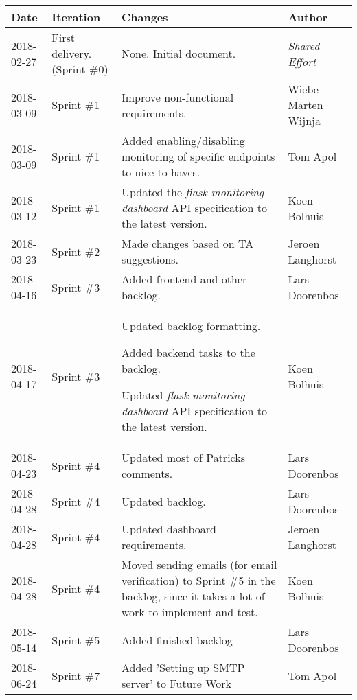 \documentclass[12pt]{article}
\begin{document}
\begin{longtable}[width=\pagewidth]{@{}llp{6cm}l@{}}
\textbf{Date} & \textbf{Iteration} & \textbf{Changes} &
\textbf{Author}\tabularnewline
\endhead
2018-02-27 & First delivery. (Sprint \#0) & None. Initial document. &
\emph{Shared Effort}\tabularnewline
2018-03-09 & Sprint \#1 & Improve non-functional requirements. &
Wiebe-Marten Wijnja\tabularnewline
2018-03-09 & Sprint \#1 & Added enabling/disabling monitoring of
specific endpoints to nice to haves. & Tom Apol\tabularnewline
2018-03-12 & Sprint \#1 & Updated the \emph{flask-monitoring-dashboard}
API specification to the latest version. & Koen Bolhuis\tabularnewline
2018-03-23 & Sprint \#2 & Made changes based on TA suggestions. & Jeroen
Langhorst\tabularnewline
2018-04-16 & Sprint \#3 & Added frontend and other backlog. & Lars
Doorenbos\tabularnewline
\begin{minipage}[t]{0.22\columnwidth}\raggedright
2018-04-17\strut
\end{minipage} & \begin{minipage}[t]{0.22\columnwidth}\raggedright
Sprint \#3\strut
\end{minipage} & \begin{minipage}[t]{0.22\columnwidth}\raggedright
Updated backlog formatting.

Added backend tasks to the backlog.

Updated \emph{flask-monitoring-dashboard} API specification to the
latest version.\strut
\end{minipage} & \begin{minipage}[t]{0.22\columnwidth}\raggedright
Koen Bolhuis\strut
\end{minipage}\tabularnewline
2018-04-23 & Sprint \#4 & Updated most of Patricks comments. & Lars
Doorenbos\tabularnewline
2018-04-28 & Sprint \#4 & Updated backlog. & Lars
Doorenbos\tabularnewline
2018-04-28 & Sprint \#4 & Updated dashboard requirements. & Jeroen
Langhorst\tabularnewline
2018-04-28 & Sprint \#4 & Moved sending emails (for email verification)
to Sprint \#5 in the backlog, since it takes a lot of work to implement
and test. & Koen Bolhuis\tabularnewline
2018-05-14 & Sprint \#5 & Added finished backlog & Lars
Doorenbos\tabularnewline
2018-06-24 & Sprint \#7 & Added 'Setting up SMTP server' to Future Work
& Tom Apol\tabularnewline
\end{longtable}
\end{document}
